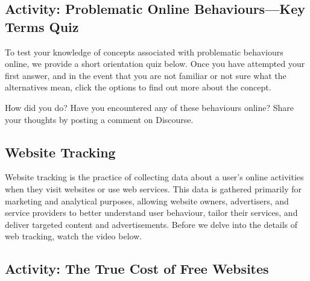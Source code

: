 \documentclass[
  letterpaper,
  DIV=11,
  numbers=noendperiod]{scrreprt}
\begin{document}
\subsection{Activity: Problematic Online Behaviours---Key Terms
Quiz}\label{activity-problematic-online-behaviourskey-terms-quiz}

\begin{tcolorbox}[enhanced jigsaw, toprule=.15mm, colback=white, colframe=quarto-callout-note-color-frame, bottomtitle=1mm, leftrule=.75mm, coltitle=black, titlerule=0mm, rightrule=.15mm, colbacktitle=quarto-callout-note-color!10!white, left=2mm, title={Learning Activity}, opacitybacktitle=0.6, opacityback=0, breakable, toptitle=1mm, arc=.35mm, bottomrule=.15mm]

To test your knowledge of concepts associated with problematic
behaviours online, we provide a short orientation quiz below. Once you
have attempted your first answer, and in the event that you are not
familiar or not sure what the alternatives mean, click the options to
find out more about the concept.

How did you do? Have you encountered any of these behaviours online?
Share your thoughts by posting a comment on Discourse.

\end{tcolorbox}

\subsection*{Website Tracking}\label{website-tracking}

Website tracking is the practice of collecting data about a user's
online activities when they visit websites or use web services. This
data is gathered primarily for marketing and analytical purposes,
allowing website owners, advertisers, and service providers to better
understand user behaviour, tailor their services, and deliver targeted
content and advertisements. Before we delve into the details of web
tracking, watch the video below.

\subsection{Activity: The True Cost of Free
Websites}\label{activity-the-true-cost-of-free-websites}
\end{document}
